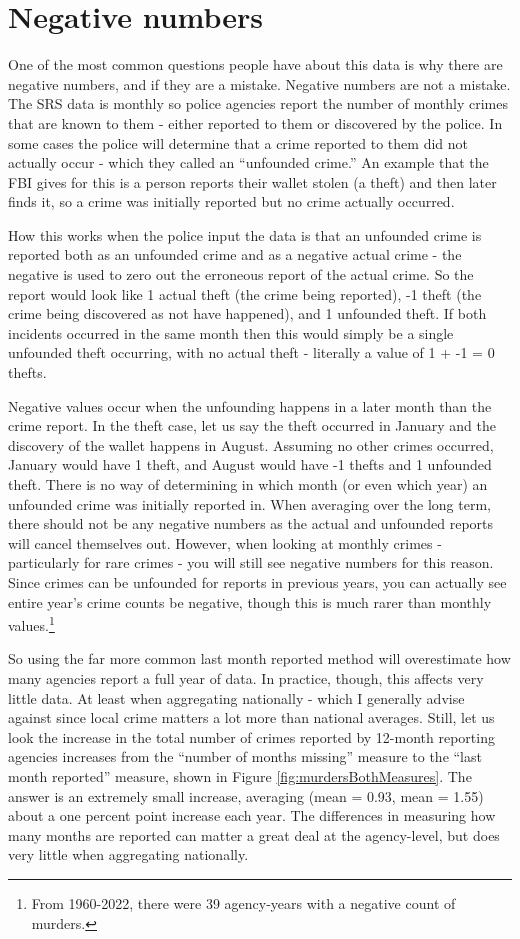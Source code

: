 \documentclass[
]{krantz}
\begin{document}
\section{Negative numbers}\label{negative-numbers}

One of the most common questions people have about this data
is why there are negative numbers, and if they are a
mistake. Negative numbers are not a mistake. The SRS data is
monthly so police agencies report the number of monthly
crimes that are known to them - either reported to them or
discovered by the police. In some cases the police will
determine that a crime reported to them did not actually
occur - which they called an ``unfounded crime.'' An example
that the FBI gives for this is a person reports their wallet
stolen (a theft) and then later finds it, so a crime was
initially reported but no crime actually occurred.

How this works when the police input the data is that an
unfounded crime is reported both as an unfounded crime and
as a negative actual crime - the negative is used to zero
out the erroneous report of the actual crime. So the report
would look like 1 actual theft (the crime being reported),
-1 theft (the crime being discovered as not have happened),
and 1 unfounded theft. If both incidents occurred in the
same month then this would simply be a single unfounded
theft occurring, with no actual theft - literally a value of
1 + -1 = 0 thefts.

Negative values occur when the unfounding happens in a later
month than the crime report. In the theft case, let us say
the theft occurred in January and the discovery of the
wallet happens in August. Assuming no other crimes occurred,
January would have 1 theft, and August would have -1 thefts
and 1 unfounded theft. There is no way of determining in
which month (or even which year) an unfounded crime was
initially reported in. When averaging over the long term,
there should not be any negative numbers as the actual and
unfounded reports will cancel themselves out. However, when
looking at monthly crimes - particularly for rare crimes -
you will still see negative numbers for this reason. Since
crimes can be unfounded for reports in previous years, you
can actually see entire year's crime counts be negative,
though this is much rarer than monthly values.\footnote{From
  1960-2022, there were 39 agency-years with a negative
  count of murders.}

So using the far more common last month reported method will
overestimate how many agencies report a full year of data.
In practice, though, this affects very little data. At least
when aggregating nationally - which I generally advise
against since local crime matters a lot more than national
averages. Still, let us look the increase in the total
number of crimes reported by 12-month reporting agencies
increases from the ``number of months missing'' measure to
the ``last month reported'' measure, shown in Figure
\ref{fig:murdersBothMeasures}. The answer is an extremely
small increase, averaging (mean = 0.93, mean = 1.55) about a
one percent point increase each year. The differences in
measuring how many months are reported can matter a great
deal at the agency-level, but does very little when
aggregating nationally.
\end{document}
